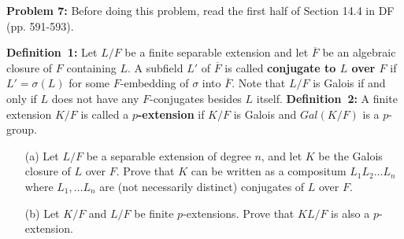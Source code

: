 \documentclass[12pt]{article}
\begin{document}
{\bf Problem 7:} \rm Before doing this problem, read the first half
of Section 14.4 in DF (pp. 591-593).

{\bf Definition~1:} Let $L/F$ be a finite separable extension
and let $\overline F$ be an algebraic closure of $F$ containing $L$.
A subfield $L'$ of $\overline F$ is called
{\bf conjugate to $L$ over $F$} if $L'=\sigma(L)$ for some $F$-embedding of
$\sigma$ into $\overline F$. Note that $L/F$ is Galois if and
only if $L$ does not have any $F$-conjugates besides $L$ itself.
\skv
{\bf Definition~2:} A finite extension $K/F$ is called
a {\bf $p$-extension} if $K/F$ is Galois and $Gal(K/F)$ is a $p$-group.
\skv
\begin{itemize}
\item[(a)] Let $L/F$ be a separable extension of degree $n$, and
let $K$ be the Galois closure of $L$ over $F$. Prove that
$K$ can be written as a compositum $L_1L_2\ldots L_n$
where $L_1,\ldots L_n$ are (not necessarily distinct) conjugates of
$L$ over $F$.

\item[(b)] Let $K/F$ and $L/F$ be finite $p$-extensions. Prove
that $KL/F$ is also a $p$-extension.
\end{itemize}
\end{document}
